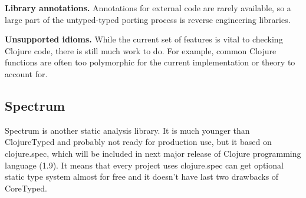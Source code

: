\textbf{Library annotations.} Annotations for external code are rarely
available, so a large part of the untyped-typed porting process is reverse
engineering libraries.

\textbf{Unsupported idioms.} While the current set of features is vital to
checking Clojure code, there is still much work to do. For example, common
Clojure functions are often too polymorphic for the current implementation or
theory to account for.



\subsection{Spectrum}
Spectrum is another static analysis library. It is much younger than
ClojureTyped and probably not ready for production use, but it based on
clojure.spec, which will be included in next major release of Clojure
programming language (1.9). It means that every project uses clojure.spec can
get optional static type system almost for free and it doesn't have last two
drawbacks of CoreTyped.






